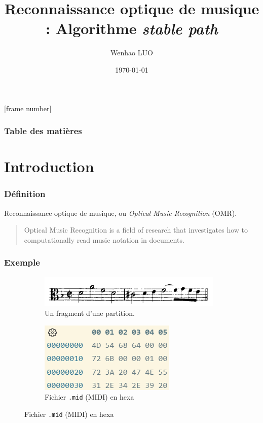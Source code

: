 \documentclass{beamer}
\title{Reconnaissance optique de musique : 
\newline Algorithme
\textit{stable path}}
\author{Wenhao LUO}
\date{\today}
\institute{Université de Quebec à Chicoutimi}
\begin{document}
[frame number]

\begin{titlepage}
\end{titlepage}

\begin{frame}
    \frametitle{Table des matières}
    \tableofcontents
\end{frame}

\section{Introduction}
\begin{frame}
    \frametitle{Définition}
    Reconnaissance optique de musique, ou \textit{Optical Music Recognition} (OMR).
    \newline

    \begin{quotation}
        Optical Music Recognition is a field of research that investigates how to computationally read music
        notation in documents.
    \end{quotation}
\end{frame}

\begin{frame}
    \frametitle{Exemple}
    \begin{figure}
    \centering
    \begin{subfigure}{.5\textwidth}
        \centering
        \includegraphics[width=.9\linewidth]{./img/music-notes.png}
        \caption{Un fragment d'une partition.}
    \end{subfigure}
    \begin{subfigure}{.5\textwidth}
        \centering
        \includegraphics{./img/midi.png}
        \caption{Fichier \texttt{.mid} (MIDI) en hexa}
    \end{subfigure}
    \end{figure}
\end{frame}
\end{document}
